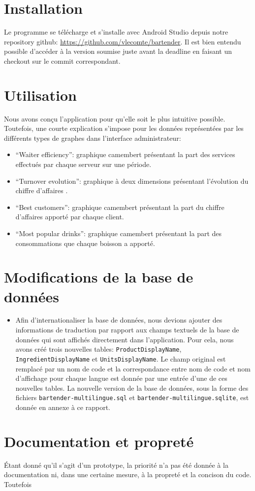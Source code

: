 \documentclass[a4paper,10pt]{article}
\begin{document}

\section{Installation}

Le programme se télécharge et s'installe avec Android Studio depuis notre repository github:
\url{https://github.com/vlecomte/bartender}.
Il est bien entendu possible d'accéder à la version soumise juste avant la deadline en faisant un checkout sur le commit correspondant.

\section{Utilisation}

Nous avons conçu l'application pour qu'elle soit le plus intuitive possible.
Toutefois, une courte explication s'impose pour les données représentées par les différents types de graphes dans l'interface administrateur:
\begin{itemize}
    \item ``Waiter efficiency'': graphique camembert présentant la part des services effectués par chaque serveur sur une période.
    \item ``Turnover evolution'': graphique à deux dimensions présentant l'évolution du chiffre d'affaires .
    \item ``Best customers'': graphique camembert présentant la part du chiffre d'affaires apporté par chaque client.
    \item ``Most popular drinks'': graphique camembert présentant la part des consommations que chaque boisson a apporté.
\end{itemize}

\section{Modifications de la base de données}

\begin{itemize}
    \item Afin d'internationaliser la base de données, nous devions ajouter des informations de traduction par rapport aux champs textuels de la base de données qui sont affichés directement dans l'application. Pour cela, nous avons créé trois nouvelles tables: \texttt{ProductDisplayName}, \texttt{IngredientDisplayName} et \texttt{UnitsDisplayName}. Le champ original est remplacé par un nom de code et la correspondance entre nom de code et nom d'affichage pour chaque langue est donnée par une entrée d'une de ces nouvelles tables. La nouvelle version de la base de données, sous la forme des fichiers \texttt{bartender-multilingue.sql} et \texttt{bartender-multilingue.sqlite}, est donnée en annexe à ce rapport.
\end{itemize}

\section{Documentation et propreté}

Étant donné qu'il s'agit d'un prototype, la priorité n'a pas été donnée à la documentation ni, dans une certaine mesure, à la propreté et la concison du code. Toutefois
\end{document}
